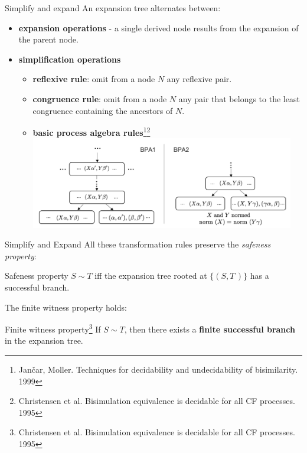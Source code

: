 \documentclass[10pt]{beamer}
\begin{document}
\begin{frame} {Simplify and expand}
	An expansion tree alternates between:
	\vspace*{-1mm}
	\begin{itemize} 
		\item {\color{mLightBrown} \bf expansion operations} - a single derived node results from the expansion of the parent node. \pause
		\item {\color{teal}\bf simplification operations	}
		\begin{itemize}
			\item {\bf reflexive rule}: omit from a node $N$ any reflexive pair.
			\item {\bf congruence rule}: omit from a node $N$ any pair that belongs to the least congruence containing the ancestors of $N$. \pause
			\item {\bf basic process algebra rules}\footnote{Jan{\v{c}}ar, Moller. Techniques for decidability and undecidability of bisimilarity. 1999}\footnote{ Christensen et al. Bisimulation equivalence is decidable for all CF processes. 1995}\\
			\vspace*{-2mm}
			\hspace*{-2cm}\includegraphics[height=4cm]{img/bpa_new}\smallskip
		\end{itemize}
	\end{itemize}
\end{frame}

\begin{frame}{Simplify and Expand}
	All these transformation rules preserve the \emph{safeness property}:
	\begin{block}{Safeness property\footnotemark[\value{footnote}]}
		\smallskip
		$S\sim T$ iff the expansion tree rooted at $\{(S,T\,)\}$ has a successful branch.	
	\end{block}
	
	The finite witness property holds\footnotemark[\value{footnote}]:
	
	\begin{block}{Finite witness property\footnotemark[\value{footnote}]\footnote{ Christensen et al. Bisimulation equivalence is decidable for all CF processes. 1995}}
		\smallskip
		If $S\sim T$, then there exists a {\bf finite successful branch} in the expansion tree.
	\end{block}
\end{frame}
\end{document}
